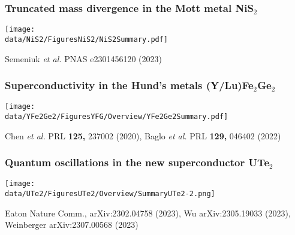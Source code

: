 \begin{emptyframe}
    \frametitle{Truncated mass divergence in the Mott metal NiS$_2$}
    \centerline{ \texttt{[image: \\data/NiS2/FiguresNiS2/NiS2Summary.pdf]}}
\vspace{-1 em}
\vfill
\centerline{\makebox[\linewidth]{\rule{0.85\textwidth}{0.4pt}}}
\centerline{\scriptsize Semeniuk {\it et al.} PNAS e2301456120 (2023)}
\end{emptyframe}

\begin{emptyframe}
    \frametitle{Superconductivity in the Hund's metals (Y/Lu)Fe$_2$Ge$_2$}
    \centerline{ \texttt{[image: \\data/YFe2Ge2/FiguresYFG/Overview/YFe2Ge2Summary.pdf]}}
\vspace{-1 em}
\vfill 
\centerline{\makebox[\linewidth]{\rule{0.85\textwidth}{0.4pt}}}
\centerline{\scriptsize Chen {\it et al.} PRL {\bf 125,} 237002 (2020), Baglo {\it et al.} PRL {\bf 129,} 046402 (2022)}
\end{emptyframe}

\begin{emptyframe}
    \frametitle{Quantum oscillations in the new superconductor UTe$_2$}
    \centerline{ \texttt{[image: \\data/UTe2/FiguresUTe2/Overview/SummaryUTe2-2.png]}}
\vspace{-1 em}
\vfill 
\centerline{\makebox[\linewidth]{\rule{0.85\textwidth}{0.4pt}}}
\centerline{\scriptsize Eaton Nature Comm., arXiv:2302.04758 (2023), Wu arXiv:2305.19033 (2023), Weinberger arXiv:2307.00568 (2023)}
\end{emptyframe}

